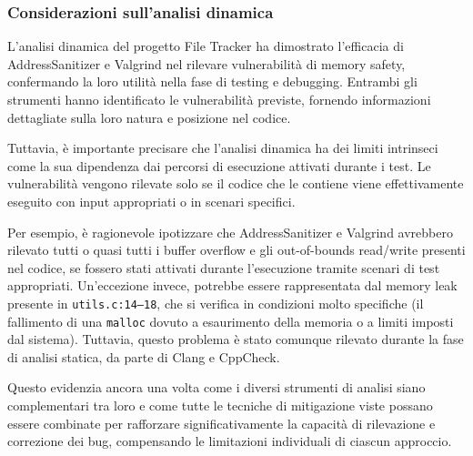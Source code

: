 \subsubsection*{Considerazioni sull'analisi dinamica}
L'analisi dinamica del progetto File Tracker ha dimostrato l'efficacia di
AddressSanitizer e Valgrind nel rilevare vulnerabilità di memory safety, confermando
la loro utilità nella fase di testing e debugging. Entrambi gli strumenti hanno
identificato le vulnerabilità previste, fornendo informazioni dettagliate sulla loro
natura e posizione nel codice.

Tuttavia, è importante precisare che l'analisi dinamica ha dei limiti intrinseci
come la sua dipendenza dai percorsi di esecuzione attivati durante i test. Le vulnerabilità
vengono rilevate solo se il codice che le contiene viene effettivamente eseguito
con input appropriati o in scenari specifici.

Per esempio, è ragionevole ipotizzare che AddressSanitizer e Valgrind avrebbero
rilevato tutti o quasi tutti i buffer overflow e gli out-of-bounds read/write
presenti nel codice, se fossero stati attivati durante l'esecuzione tramite scenari
di test appropriati. Un'eccezione invece, potrebbe essere rappresentata dal memory
leak presente in \texttt{utils.c:14--18}, che si verifica in condizioni molto specifiche
(il fallimento di una \texttt{malloc} dovuto a esaurimento della memoria o a limiti
imposti dal sistema). Tuttavia, questo problema è stato comunque rilevato
durante la fase di analisi statica, da parte di Clang e CppCheck.

Questo evidenzia ancora una volta come i diversi strumenti di analisi siano
complementari tra loro e come tutte le tecniche di mitigazione viste possano
essere combinate per rafforzare significativamente la capacità di rilevazione e
correzione dei bug, compensando le limitazioni individuali di ciascun approccio.